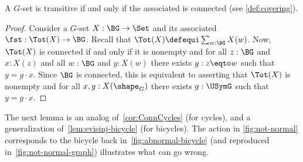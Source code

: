 \begin{lemma}
  \label{lem:conistrans}
  A $G$-set is transitive if and only if 
  the associated \covering is connected (see \cref{def:covering}).
\end{lemma}
\begin{proof}
  Consider a $G$-set $X:\BG\to\Set$ and its associated \covering
  $\fst:\Tot(X)\to\BG$. Recall that $\Tot(X)\defequi\sum_{w:\BG}X(w)$.  Now,
  $\Tot(X)$ is connected if and only if it is nonempty and for all $z:\BG$ and
  $x:X(z)$ and all $w:\BG$ and $y:X(w)$ there exists $g:z\eqto w$ such that
  $y=g\cdot x$. Since $\BG$ is connected, this is equivalent to asserting that
  $\Tot(X)$ is nonempty and for all $x,y:X(\sh_G)$ there exists $g:\USymG$ such
  that $y=g\cdot x$.
\end{proof}

The next lemma is an analog of~\cref{cor:ConnCycles} (for cycles),
and a generalization of~\cref{lem:evisinj-bicycle} (for bicycles).
The action in \cref{fig:not-normal}
corresponds to the bicycle back in~\cref{fig:abnormal-bicycle}
(and reproduced in~\cref{fig:not-normal-graph})
illustrates what can go wrong.
